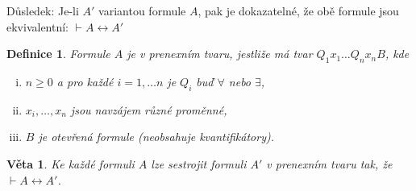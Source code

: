 \documentclass[a4paper, 11pt]{report}
\newtheorem{mydef}{Definice}[chapter]
\newtheorem{veta}{Věta}[chapter]
\begin{document}
Důsledek: Je-li $A'$ variantou formule $A$, pak je dokazatelné, že obě formule jsou ekvivalentní: $\vdash A \leftrightarrow A'$

\begin{mydef}
Formule $A$ je v \emph{prenexním tvaru}, jestliže má tvar $Q_1 x_1 \dots Q_n x_n B$, kde
\begin{enumerate}[(i)]
	\item $n \geq 0$ a pro každé $i = 1, \dots n$ je $Q_i$ buď $\forall$ nebo $\exists$,
	\item $x_i, \dots, x_n$  jsou navzájem různé proměnné,
	\item $B$ je otevřená formule (neobsahuje kvantifikátory).
\end{enumerate}
\end{mydef}

\begin{veta}
Ke každé formuli $A$ lze sestrojit formuli $A'$ v prenexním tvaru tak, že $\vdash A \leftrightarrow A'$.
\end{veta}
\end{document}
